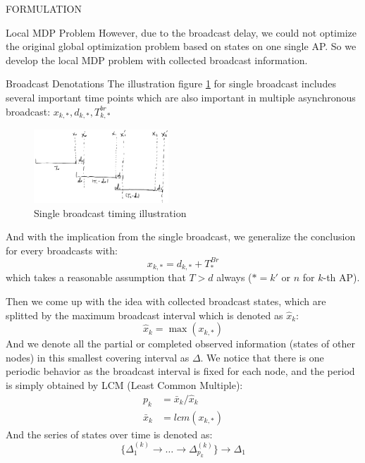 \documentclass[10pt, conference, letterpaper]{IEEEtran}
\begin{document}
\begin{section}{FORMULATION}
\begin{subsection}{Local MDP Problem}
            However, due to the broadcast delay, we could not optimize the original global optimization problem based on states on one single AP. So we develop the local MDP problem with collected broadcast information.

            \begin{subsubsection}{Broadcast Denotations}
                The illustration figure \ref{fig:brd} for single broadcast includes several important time points which are also important in multiple asynchronous broadcast: $x_{k,*}, d_{k,*}, T^{br}_{k,*}$

                \begin{figure}[h]
                    \label{fig:brd}
                    \centering
                    \includegraphics[width=0.45\textwidth]{single-broadcast.png}
                    \caption{Single broadcast timing illustration}
                \end{figure}

                And with the implication from the single broadcast, we generalize the conclusion for every broadcasts with:
                $$
                x_{k,*} = d_{k,*} + T^{Br}_{*}
                $$
                which takes a reasonable assumption that $T>d$ always ($*=k'$ or $n$ for $k$-th AP).

                Then we come up with the idea with collected broadcast states, which are splitted by the maximum broadcast interval which is denoted as $\hat{x}_k$:
                $$
                \hat{x}_k = \max(x_{k,*})
                $$
                And we denote all the partial or completed observed information (states of other nodes) in this smallest covering interval as $\Delta$.
                We notice that there is one periodic behavior as the broadcast interval is fixed for each node, and the period is simply obtained by LCM (Least Common Multiple):
                \begin{align*}
                    p_{k} &= \bar{x}_k/\hat{x}_k
                    \\
                    \bar{x}_k &= lcm(x_{k,*})
                \end{align*}
                And the series of states over time is denoted as:
                $$
                \{ \Delta^{(k)}_1 \to \dots \to \Delta^{(k)}_{p_k} \} \to \Delta_{1}
                $$
                

\end{subsubsection}
\end{subsection}
\end{section}
\end{document}
